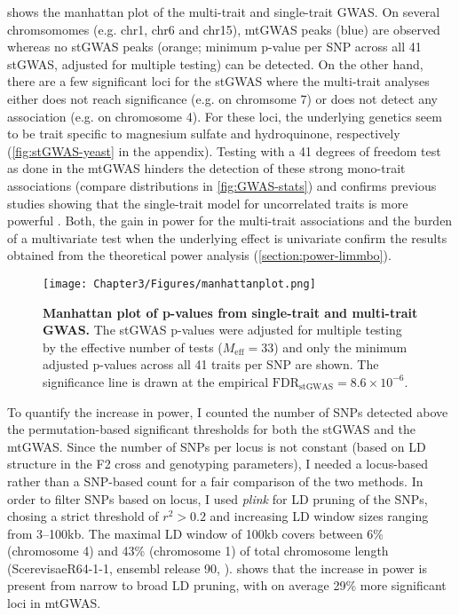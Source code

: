  shows the manhattan plot of the multi-trait and single-trait GWAS. On several chromsomomes (e.g. chr1, chr6 and chr15), mtGWAS peaks (blue) are observed whereas no stGWAS peaks (orange; minimum p-value per SNP across all \num{41} stGWAS, adjusted for multiple testing) can be detected. On the other hand, there are a few significant loci for the stGWAS where the multi-trait analyses either does not reach significance (e.g. on chromsome \num{7}) or does not detect any association (e.g. on chromosome \num{4}). For these loci, the underlying genetics seem to be trait specific to magnesium sulfate and hydroquinone, respectively (\cref{fig:stGWAS-yeast} in the appendix). Testing with a \num{41} degrees of freedom test as done in the mtGWAS hinders the detection of these strong mono-trait associations (compare distributions in \cref{fig:GWAS-stats}) and confirms previous studies showing that the single-trait model for uncorrelated traits is more powerful \citep{Korte2010}. Both, the gain in power for the multi-trait associations and the burden of a multivariate test when the underlying effect is univariate confirm the results obtained from the theoretical power analysis (\cref{section:power-limmbo}). 

\begin{figure}[hbtp]
	\centering
	\texttt{[image: Chapter3/Figures/manhattanplot.png]}
	\caption[\textbf{Manhattan plot of p-values from single-trait and multi-trait GWAS.}]{\textbf{Manhattan plot of p-values from single-trait and multi-trait GWAS.} The stGWAS p-values were adjusted for multiple testing by the effective number of tests (\(M_\text{eff} = 33\)) and only the minimum adjusted p-values across all \num{41} traits per SNP are shown. The significance line is drawn at the empirical \(\text{FDR}_{\text{stGWAS}} =8.6 \times 10^{-6}\).}
 	\label{fig:GWAS-yeast}
\end{figure}

To quantify the increase in power, I counted the number of SNPs detected above the permutation-based significant thresholds for both the stGWAS and the mtGWAS. Since the number of SNPs per locus is not constant (based on LD structure in the F2 cross and genotyping parameters), I needed a locus-based rather than a SNP-based count for a fair comparison of the two methods. In order to filter SNPs based on locus, I used \textit{plink} for LD pruning of the SNPs, chosing a strict threshold of \(r^2 > 0.2\) and increasing LD window sizes ranging from \numrange{3}{100}kb.  The maximal LD window of \num{100}kb covers between \num{6}\% (chromosome \num{4}) and \num{43}\% (chromosome 1) of total chromosome length (ScerevisaeR64-1-1, ensembl release 90, \citep{Aken2016}).  shows that the increase in power is present from narrow to broad LD pruning, with on average \num{29}\% more significant loci in mtGWAS.


